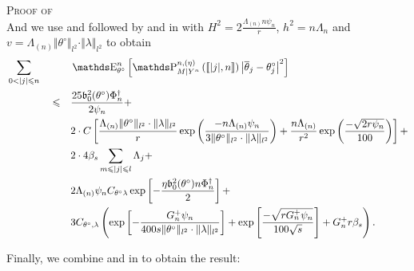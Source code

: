 \begin{pro}{\textsc{Proof of } \\}
And we use  and  followed by  and  in  with $H^{2} = 2\frac{\Lambda_{(n)}n\psi_{n}}{r}$, $h^{2} = n \Lambda_{n}$ and $v = \Lambda_{(n)} \Vert \theta^{\circ} \Vert_{l^{2}} \cdot \Vert \lambda \Vert_{l^{2}}$ to obtain
\begin{alignat}{3}
& \sum\limits_{0 < \vert j \vert \leq n} && && \E_{\theta^{\circ}}^{n}\left[\P_{M \vert Y^{n}}^{n, (\eta)} \left(\llbracket \vert j \vert, n \rrbracket \right) \left\vert  \overline{\theta}_{j} - \theta^{\circ}_{j} \right\vert^{2}\right] \notag\\
& &&\leq&& \frac{25 \mathfrak{b}_{0}^{2}(\theta^{\circ}) \Phi^{\dagger}_{n}}{2 \psi_{n}} + \notag\\
& && && 2 \cdot C \left[\frac{\Lambda_{(n)} \Vert \theta^{\circ} \Vert_{l^{2}} \cdot \Vert \lambda \Vert_{l^{2}}}{r} \exp\left(\frac{-n \Lambda_{(n)} \psi_{n}}{3 \Vert \theta^{\circ} \Vert_{l^{2}} \cdot \Vert \lambda \Vert_{l^{2}}}\right) + \frac{n \Lambda_{(n)}}{r^{2}} \exp\left(\frac{- \sqrt{2 r \psi_{n}}}{100}\right)\right] +\notag\\
& && && 2 \cdot 4 \beta_{s} \sum\limits_{m \leq \vert j \vert \leq l} \Lambda_{j}+\notag\\
& && && 2 \Lambda_{(n)} \psi_{n} C_{\theta^{\circ} \lambda} \exp \left[-\frac{\eta \mathfrak{b}_{0}^{2}(\theta^{\circ}) n \Phi^{\dagger}_{n}}{2}\right] +\notag\\
& && && 3 C_{\theta^{\circ}, \lambda} \left(\exp\left[- \frac{G^{+}_{n} \psi_{n}}{400 s \Vert \theta^{\circ} \Vert_{l^{2}} \cdot \Vert \lambda \Vert_{l^{2}}}\right] + \exp\left[ \frac{- \sqrt{r G^{+}_{n} \psi_{n}}}{100 \sqrt{s}}\right] + G^{+}_{n} r\beta_{s}\right)\label{EQD.47}.
\end{alignat}

Finally, we combine  and  in  to obtain the result:


\end{pro}
